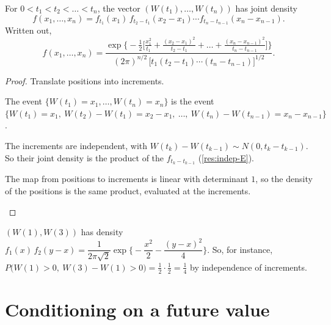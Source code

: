 \begin{result}
\label{res:joint-density}
For $0<t_1<t_2<\dots<t_n$, the vector $(W(t_1),\dots,W(t_n))$ has joint density
\[
  f(x_1,\dots,x_n)=f_{t_1}(x_1)\,f_{t_2-t_1}(x_2-x_1)\cdots f_{t_n-t_{n-1}}(x_n-x_{n-1}).
\]
Written out,
\[
  f(x_1,\dots,x_n)=\frac{\exp\Big\{-\frac12\Big[\frac{x_1^2}{t_1}+\frac{(x_2-x_1)^2}{t_2-t_1}+\dots+\frac{(x_n-x_{n-1})^2}{t_n-t_{n-1}}\Big]\Big\}}{(2\pi)^{n/2}\,\big[t_1(t_2-t_1)\cdots(t_n-t_{n-1})\big]^{1/2}} .
\]
\end{result}
\begin{proof}
Translate positions into increments.
\begin{steps}
  \item The event $\{W(t_1)=x_1,\dots,W(t_n)=x_n\}$ is the event $\{W(t_1)=x_1,\ W(t_2)-W(t_1)=x_2-x_1,\ \dots,\ W(t_n)-W(t_{n-1})=x_n-x_{n-1}\}$.
  \item The increments are independent, with $W(t_k)-W(t_{k-1})\sim N(0,t_k-t_{k-1})$. So their joint density is the product of the $f_{t_k-t_{k-1}}$ (\cref{res:indep-E}).
  \item The map from positions to increments is linear with determinant $1$, so the density of the positions is the same product, evaluated at the increments. \qedhere
\end{steps}
\end{proof}

\begin{example}
$(W(1),W(3))$ has density $f_1(x)\,f_2(y-x)=\dfrac{1}{2\pi\sqrt2}\exp\Big\{-\dfrac{x^2}{2}-\dfrac{(y-x)^2}{4}\Big\}$. So, for instance, $P\big(W(1)>0,\ W(3)-W(1)>0\big)=\frac12\cdot\frac12=\frac14$ by independence of increments.
\end{example}

\section{Conditioning on a future value}

